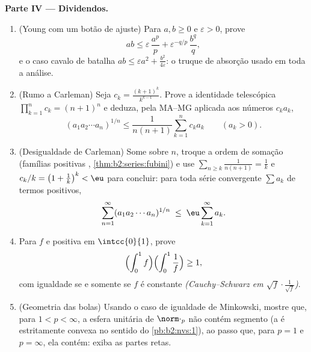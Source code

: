 \begin{problem}
\medskip
\noindent\textbf{Parte IV --- Dividendos.}
\begin{enumerate}[resume]
  \item (Young com um botão de ajuste) Para $a, b \geq 0$ e $\varepsilon >
        0$, prove
        \[
        ab \leq \varepsilon\,\frac{a^p}{p} +
        \varepsilon^{-q/p}\,\frac{b^q}{q},
        \]
        e o caso cavalo de batalha $ab \leq \varepsilon a^2 +
        \frac{b^2}{4\varepsilon}$: o truque de absorção usado
        em toda a análise.
  \item (Rumo a Carleman) Seja $c_k = \frac{(k+1)^k}{k^{k-1}}$.
        Prove a identidade telescópica $\prod_{k=1}^{n}c_k =
        (n+1)^n$ e deduza, pela MA--MG aplicada aos números
        $c_ka_k$,
        \[
        (a_1a_2\cdots a_n)^{1/n} \leq
        \frac{1}{n(n+1)}\sum_{k=1}^{n} c_k a_k
        \qquad (a_k > 0).
        \]
  \item (Desigualdade de Carleman) Some sobre $n$, troque a
        ordem de somação (famílias positivas ,
        \cref{thm:b2:series:fubini}) e use $\sum_{n \geq
        k}\frac{1}{n(n+1)} = \frac1k$ e $c_k/k = \bigl(1 +
        \frac1k\bigr)^k < \eu$ para concluir: para toda
        série convergente $\sum a_k$ de termos positivos,
        \[
        \sum_{n=1}^{\infty}(a_1a_2\cdots a_n)^{1/n}
        \;\leq\; \eu\sum_{k=1}^{\infty}a_k .
        \]
  \item Para $f$  e positiva em $\intcc{0}{1}$,
        prove
        \[
        \Bigl(\int_0^1 f\Bigr)\Bigl(\int_0^1\frac1f\Bigr)
        \geq 1,
        \]
        com igualdade se e somente se $f$ é constante
        \emph{(Cauchy--Schwarz em $\sqrt f\cdot\frac1{\sqrt
        f}$)}.
  \item (Geometria das bolas) Usando o caso de igualdade de
        Minkowski, mostre que, para $1 < p < \infty$, a esfera
        unitária de $\norm\cdot_p$ não contém segmento (a 
        é estritamente convexa no sentido do
        \cref{pb:b2:nvs:1}), ao passo que, para $p = 1$ e $p =
        \infty$, ela contém: exiba as partes retas.
\end{enumerate}


\end{problem}
